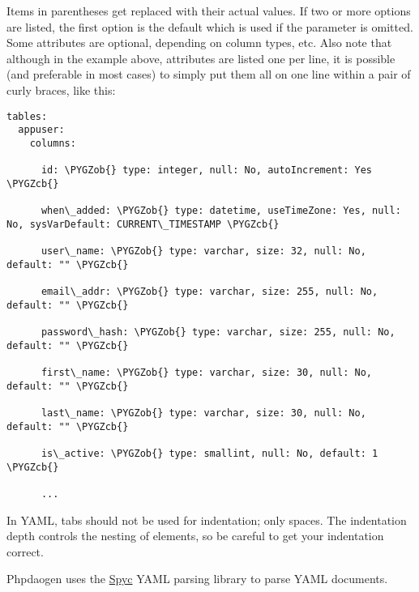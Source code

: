 \documentclass[letterpaper,10pt,english]{sphinxmanual}
\def\PYGZob{\char`\{}
\def\PYGZcb{\char`\}}
\begin{document}
Items in parentheses get replaced with their actual values.  If two or more options are listed, the
first option is the default which is used if the parameter is omitted.  Some attributes are
optional, depending on column types, etc.  Also note that although in the example above, attributes
are listed one per line, it is possible (and preferable in most cases) to simply put them all on one
line within a pair of curly braces, like this:

\begin{Verbatim}[commandchars=\\\{\}]
tables:
  appuser:
    columns:

      id: \PYGZob{} type: integer, null: No, autoIncrement: Yes \PYGZcb{}

      when\_added: \PYGZob{} type: datetime, useTimeZone: Yes, null: No, sysVarDefault: CURRENT\_TIMESTAMP \PYGZcb{}

      user\_name: \PYGZob{} type: varchar, size: 32, null: No, default: "" \PYGZcb{}

      email\_addr: \PYGZob{} type: varchar, size: 255, null: No, default: "" \PYGZcb{}

      password\_hash: \PYGZob{} type: varchar, size: 255, null: No, default: "" \PYGZcb{}

      first\_name: \PYGZob{} type: varchar, size: 30, null: No, default: "" \PYGZcb{}

      last\_name: \PYGZob{} type: varchar, size: 30, null: No, default: "" \PYGZcb{}

      is\_active: \PYGZob{} type: smallint, null: No, default: 1 \PYGZcb{}

      ...
\end{Verbatim}

In YAML, tabs should not be used for indentation; only spaces.  The indentation depth controls the
nesting of elements, so be careful to get your indentation correct.

Phpdaogen uses the \href{http://code.google.com/p/spyc/}{Spyc} YAML parsing library to parse YAML
documents.
\end{document}
